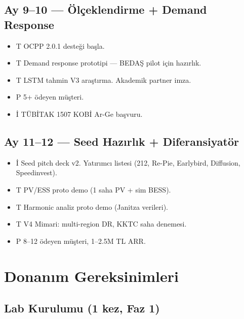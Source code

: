 \documentclass[11pt,a4paper]{article}
\begin{document}
\subsection*{Ay 9--10 — Ölçeklendirme + Demand Response}

\begin{itemize}
    \item {\color{blue!50!black}T} OCPP 2.0.1 desteği başla.
    \item {\color{blue!50!black}T} Demand response prototipi --- BEDAŞ pilot için hazırlık.
    \item {\color{blue!50!black}T} LSTM tahmin V3 araştırma. Akademik partner imza.
    \item {\color{green!50!black}P} 5+ ödeyen müşteri.
    \item {\color{red!50!black}İ} TÜBİTAK 1507 KOBİ Ar-Ge başvuru.
\end{itemize}

\subsection*{Ay 11--12 — Seed Hazırlık + Diferansiyatör}

\begin{itemize}
    \item {\color{red!50!black}İ} Seed pitch deck v2. Yatırımcı listesi (212, Re-Pie, Earlybird, Diffusion, Speedinvest).
    \item {\color{blue!50!black}T} PV/ESS proto demo (1 saha PV + sim BESS).
    \item {\color{blue!50!black}T} Harmonic analiz proto demo (Janitza verileri).
    \item {\color{blue!50!black}T} V4 Mimari: multi-region DR, KKTC saha denemesi.
    \item {\color{green!50!black}P} 8--12 ödeyen müşteri, 1--2.5M TL ARR.
\end{itemize}

\section{Donanım Gereksinimleri}

\subsection{Lab Kurulumu (1 kez, Faz 1)}
\end{document}
